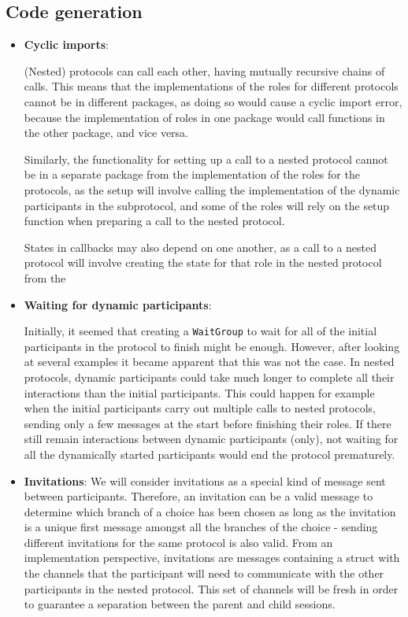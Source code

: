 \documentclass[12pt,twoside]{report}
\begin{document}
\subsection{Code generation}
\begin{itemize}
    \item \textbf{Cyclic imports}:
    
    
    (Nested) protocols can call each other, having mutually recursive chains of calls. This means that the implementations of the roles for different protocols cannot be in different packages, as doing so would cause a cyclic import error, because the implementation of roles in one package would call functions in the other package, and vice versa.
    
    Similarly, the functionality for setting up a call to a nested protocol cannot be in a separate package from the implementation of the roles for the protocols, as the setup will involve calling the implementation of the dynamic participants in the subprotocol, and some of the roles will rely on the setup function when preparing a call to the nested protocol. 
    
    States in callbacks may also depend on one another, as a call to a nested protocol will involve creating the state for that role in the nested protocol from the 
    
    \item \textbf{Waiting for dynamic participants}:
    
    Initially, it seemed that creating a \texttt{WaitGroup} to wait for all of the initial participants in the protocol to finish might be enough. However, after looking at several examples it became apparent that this was not the case. In nested protocols, dynamic participants could take much longer to complete all their interactions than the initial participants. This could happen for example when the initial participants carry out multiple calls to nested protocols, sending only a few messages at the start before finishing their roles. If there still remain interactions between dynamic participants (only), not waiting for all the dynamically started participants would end the protocol prematurely. 
    
    \item \textbf{Invitations}: We will consider invitations as a special kind of message sent between participants. Therefore, an invitation can be a valid message to determine which branch of a choice has been chosen as long as the invitation is a unique first message amongst all the branches of the choice - sending different invitations for the same protocol is also valid. From an implementation perspective, invitations are messages containing a struct with the channels that the participant will need to communicate with the other participants in the nested protocol. This set of channels will be fresh in order to guarantee a separation between the parent and child sessions.


\end{itemize}
\end{document}
